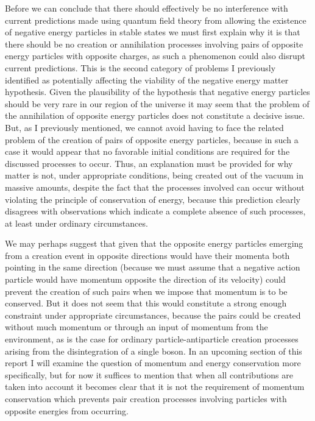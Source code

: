 \documentclass[notitlepage,12pt]{report}
\begin{document}
Before we can conclude that there should effectively be no interference with current predictions made using quantum field theory from allowing the existence of negative energy particles in stable states we must first explain why it is that there should be no creation or annihilation processes involving pairs of opposite energy particles with opposite charges, as such a phenomenon could also disrupt current predictions. This is the second category of problems I previously identified as potentially affecting the viability of the negative energy matter hypothesis. Given the plausibility of the hypothesis that negative energy particles should be very rare in our region of the universe it may seem that the problem of the annihilation of opposite energy particles does not constitute a decisive issue. But, as I previously mentioned, we cannot avoid having to face the related problem of the creation of pairs of opposite energy particles, because in such a case it would appear that no favorable initial conditions are required for the discussed processes to occur. Thus, an explanation must be provided for why matter is not, under appropriate conditions, being created out of the vacuum in massive amounts, despite the fact that the processes involved can occur without violating the principle of conservation of energy, because this prediction clearly disagrees with observations which indicate a complete absence of such processes, at least under ordinary circumstances.

We may perhaps suggest that given that the opposite energy particles emerging from a creation event in opposite directions would have their momenta both pointing in the same direction (because we must assume that a negative action particle would have momentum opposite the direction of its velocity) could prevent the creation of such pairs when we impose that momentum is to be conserved. But it does not seem that this would constitute a strong enough constraint under appropriate circumstances, because the pairs could be created without much momentum or through an input of momentum from the environment, as is the case for ordinary particle-antiparticle creation processes arising from the disintegration of a single boson. In an upcoming section of this report I will examine the question of momentum and energy conservation more specifically, but for now it suffices to mention that when all contributions are taken into account it becomes clear that it is not the requirement of momentum conservation which prevents pair creation processes involving particles with opposite energies from occurring.
\end{document}
